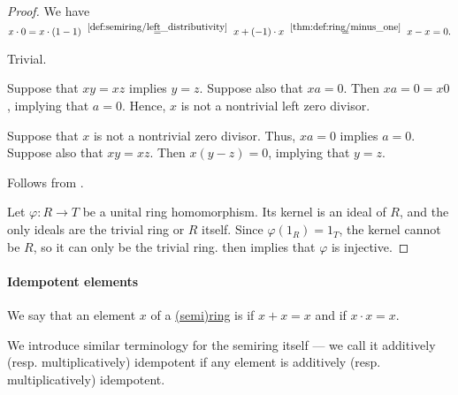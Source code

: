 \begin{proof}
   We have
  \begin{equation*}
    x \cdot 0
    =
    x \cdot (1 - 1)
    \reloset {\ref{def:semiring/left_distributivity}} =
    x + (-1) \cdot x
    \reloset {\ref{thm:def:ring/minus_one}} =
    x - x
    =
    0.
  \end{equation*}

   Trivial.


  \SufficiencySubProof* Suppose that \( xy = xz \) implies \( y = z \). Suppose also that \( xa = 0 \). Then \( xa = 0 = x0 \), implying that \( a = 0 \). Hence, \( x \) is not a nontrivial left zero divisor.

  \NecessitySubProof* Suppose that \( x \) is not a nontrivial zero divisor. Thus, \( xa = 0 \) implies \( a = 0 \). Suppose also that \( xy = xz \). Then \( x(y - z) = 0 \), implying that \( y = z \).

   Follows from .

   Let \( \varphi: R \to T \) be a unital ring homomorphism. Its kernel is an ideal of \( R \), and the only ideals are the trivial ring or \( R \) itself. Since \( \varphi(1_R) = 1_T \), the kernel cannot be \( R \), so it can only be the trivial ring.  then implies that \( \varphi \) is injective.
\end{proof}

\paragraph{Idempotent elements}

\begin{definition}\label{def:semiring_idempotent}
  We say that an element \( x \) of a \hyperref[def:semiring]{(semi)ring} is  if \( x + x = x \) and  if \( x \cdot x = x \).

  We introduce similar terminology for the semiring itself --- we call it additively (resp. multiplicatively) idempotent if any element is additively (resp. multiplicatively) idempotent.
\end{definition}

